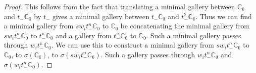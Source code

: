 \documentclass[12pt]{article}
\newcommand{\C}{\mathbb{C}}
\newcommand{\<}{\langle}
\renewcommand{\>}{\rangle}
\theoremstyle{plain}
\theoremstyle{definition}
\begin{document}
\begin{proof}
This follows from the fact that translating a minimal gallery between $\C_0$ and $t_-\C_0$ by $t_-$ gives a minimal gallery between $t_-\C_0$ and $t^2_-\C_0$. Thus we can find a minimal gallery from $sw_it^n_-\C_0$ to $\C_0$ be concatenating the minimal gallery from $sw_it^n_-\C_0$ to $t^n_-\C_0$ and a gallery from $t^n_-\C_0$ to $\C_0$. Such a minimal gallery passes through $w_it^n_-\C_0$. We can use this to construct a minimal gallery from $sw_it^n_-\C_0$ to $\C_0$, to $\sigma(\C_0)$, to $\sigma(sw_it^n_-\C_0)$. Such a gallery passes through $w_it^n_-\C_0$ and  $\sigma(w_it^n_-\C_0)$.
\end{proof}




\end{document}
